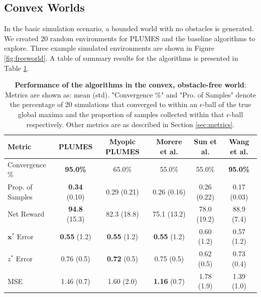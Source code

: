 \documentclass{styles/svproc}
\newcommand{\x}{\mathbf{x}}
\begin{document}
\subsection{Convex Worlds}
\label{sec:free_world}
In the basic simulation scenario, a bounded world with no obstacles is generated. We created 20 random environments for PLUMES and the baseline algorithms to explore. Three example simulated environments are shown in Figure \ref{fig:freeworld}. A table of summary results for the algorithms is presented in Table \ref{tab:free_results}. 

\begin{center}
    
\begin{table}[]
\caption{\textbf{Performance of the algorithms in the convex, obstacle-free world}: Metrics are shown as: mean (std). "Convergence \%" and "Pro. of Samples" denote the percentage of 20 simulations that  converged to within an $\epsilon$-ball of the true global maxima and the proportion of samples collected within that $\epsilon$-ball respectively. Other metrics are as described in Section \ref{sec:metrics}.}
\label{tab:free_results}
\begin{tabular}{l | c | c | c | c | c }
Metric & PLUMES & Myopic PLUMES & Morere et al. \cite{Marchant2014a} & Sun et al. \cite{Sun2017} & Wang et al. \cite{wang2017max}\\ [2pt] 
\hline 
\hline
Convergence \% & \textbf{95.0\%}  & 65.0\% & 55.0\% & 55.0\% & \textbf{95.0\%}\\
Prop. of Samples  & \textbf{0.34} (0.10) & 0.29 (0.21) & 0.26 (0.16) & 0.26 (0.22) & 0.17 (0.03)\\
Net Reward & \textbf{94.8} (15.3) & 82.3 (18.8) & 75.1 (13.2) & 78.0 (19.2) & 88.9 (7.4)\\
$\x^*$ Error & \textbf{0.55} (1.2) & \textbf{0.55} (1.2) & \textbf{0.55} (1.2) & 0.60 (1.2) & 0.57 (1.2) \\
$z^*$ Error & 0.76 (0.5) & \textbf{0.72} (0.5) & 0.75 (0.5) & 0.62 (0.5) & 0.73 (0.4) \\
MSE & 1.46 (0.7) & 1.60 (2.0) & \textbf{1.16} (0.7) & 1.78 (1.9) & 1.39 (1.0) \\
\hline
\end{tabular}
\end{table}
\end{center}
\end{document}
